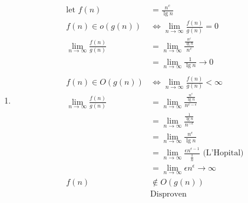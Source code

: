 \documentclass{article}
\begin{document}
\begin{enumerate}
{\begin{enumerate}
{				}
				\item {
					\begin{align*}
						\text{let }f(n) &= \frac{n^c}{\lg n}\\
						f(n) \in o(g(n)) &\iff \lim_{n\to\infty}\frac{f(n)}{g(n)} = 0\\
						\lim_{n\to\infty}\frac{f(n)}{g(n)} &=\lim_{n\to\infty}\frac{\frac{n^c}{\lg n}}{n^c}\\
						&=\lim_{n\to\infty}\frac{1}{\lg n} \to 0\\
						\\
						f(n) \in O(g(n)) &\iff \lim_{n\to\infty}\frac{f(n)}{g(n)} < \infty\\
						\lim_{n\to\infty} \frac{f(n)}{g(n)} &= \lim_{n\to\infty}\frac{\frac{n^c}{\lg n}}{n^{c-\epsilon}}\\
						&=\lim_{n\to\infty}\frac{\frac{1}{\lg n}}{n^{-\epsilon}}\\
						&=\lim_{n\to\infty}\frac{n^\epsilon}{\lg n}\\
						&=\lim_{n\to\infty}\frac{\epsilon n^{\epsilon-1}}{\frac{1}{n}} \text{ (L'Hopital)}\\
						&=\lim_{n\to\infty}\epsilon n^\epsilon \to \infty\\
						f(n) &\notin O(g(n))\\
						&\text{Disproven}
					\end{align*}
				}
			\end{enumerate}
		}
	\end{enumerate}
\end{document}
